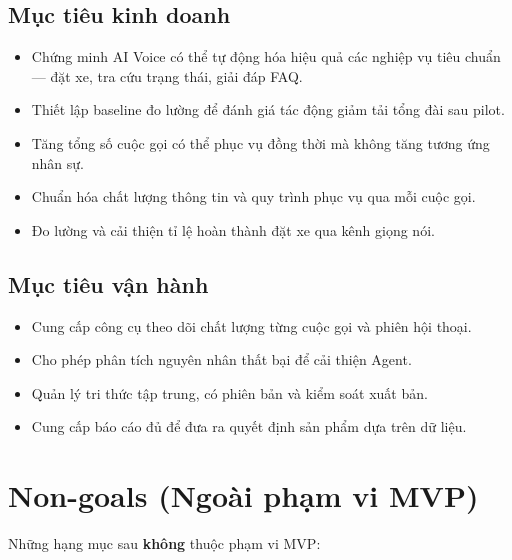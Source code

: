 \documentclass[12pt,a4paper]{article}
\begin{document}
\subsection{Mục tiêu kinh doanh}
\begin{itemize}
  \item Chứng minh AI Voice có thể tự động hóa hiệu quả các nghiệp vụ tiêu chuẩn --- đặt xe, tra cứu trạng thái, giải đáp FAQ.
  \item Thiết lập baseline đo lường để đánh giá tác động giảm tải tổng đài sau pilot.
  \item Tăng tổng số cuộc gọi có thể phục vụ đồng thời mà không tăng tương ứng nhân sự.
  \item Chuẩn hóa chất lượng thông tin và quy trình phục vụ qua mỗi cuộc gọi.
  \item Đo lường và cải thiện tỉ lệ hoàn thành đặt xe qua kênh giọng nói.
\end{itemize}

\subsection{Mục tiêu vận hành}
\begin{itemize}
  \item Cung cấp công cụ theo dõi chất lượng từng cuộc gọi và phiên hội thoại.
  \item Cho phép phân tích nguyên nhân thất bại để cải thiện Agent.
  \item Quản lý tri thức tập trung, có phiên bản và kiểm soát xuất bản.
  \item Cung cấp báo cáo đủ để đưa ra quyết định sản phẩm dựa trên dữ liệu.
\end{itemize}

\section{Non-goals (Ngoài phạm vi MVP)}

Những hạng mục sau \textbf{không} thuộc phạm vi MVP:
\end{document}
